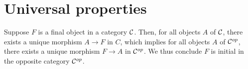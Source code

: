 \begin{xca}
\end{xca}

\section{Universal properties}
\begin{xca}
Suppose $F$ is a final object in a category $\mathcal{C}$. Then, for all objects $A$
of $\mathcal{C}$, there exists a unique morphism $A \to F$ in $C$, which implies for
all objects $A$ of $\mathcal{C}^{op}$, there exists a unique morphism $F \to A$ in
$\mathcal{C}^{op}$. We thus conclude $F$ is initial in the opposite category
$\mathcal{C}^{op}$.
\end{xca}
